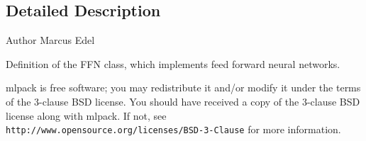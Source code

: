 \subsection{Detailed Description}
\begin{DoxyAuthor}{Author}
Marcus Edel
\end{DoxyAuthor}
Definition of the F\+FN class, which implements feed forward neural networks.

mlpack is free software; you may redistribute it and/or modify it under the terms of the 3-\/clause B\+SD license. You should have received a copy of the 3-\/clause B\+SD license along with mlpack. If not, see {\tt http\+://www.\+opensource.\+org/licenses/\+B\+S\+D-\/3-\/\+Clause} for more information. 